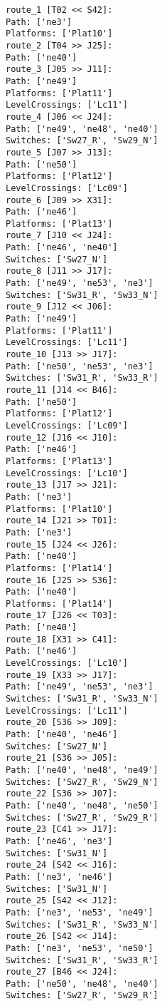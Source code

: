 	\begin{lstlisting}[language = {}, caption = Routes.RNA, label = {lst:EJ9_7}]
route_1 [T02 << S42]:
Path: ['ne3']
Platforms: ['Plat10']
route_2 [T04 >> J25]:
Path: ['ne40']
route_3 [J05 >> J11]:
Path: ['ne49']
Platforms: ['Plat11']
LevelCrossings: ['Lc11']
route_4 [J06 << J24]:
Path: ['ne49', 'ne48', 'ne40']
Switches: ['Sw27_R', 'Sw29_N']
route_5 [J07 >> J13]:
Path: ['ne50']
Platforms: ['Plat12']
LevelCrossings: ['Lc09']
route_6 [J09 >> X31]:
Path: ['ne46']
Platforms: ['Plat13']
route_7 [J10 << J24]:
Path: ['ne46', 'ne40']
Switches: ['Sw27_N']
route_8 [J11 >> J17]:
Path: ['ne49', 'ne53', 'ne3']
Switches: ['Sw31_R', 'Sw33_N']
route_9 [J12 << J06]:
Path: ['ne49']
Platforms: ['Plat11']
LevelCrossings: ['Lc11']
route_10 [J13 >> J17]:
Path: ['ne50', 'ne53', 'ne3']
Switches: ['Sw31_R', 'Sw33_R']
route_11 [J14 << B46]:
Path: ['ne50']
Platforms: ['Plat12']
LevelCrossings: ['Lc09']
route_12 [J16 << J10]:
Path: ['ne46']
Platforms: ['Plat13']
LevelCrossings: ['Lc10']
route_13 [J17 >> J21]:
Path: ['ne3']
Platforms: ['Plat10']
route_14 [J21 >> T01]:
Path: ['ne3']
route_15 [J24 << J26]:
Path: ['ne40']
Platforms: ['Plat14']
route_16 [J25 >> S36]:
Path: ['ne40']
Platforms: ['Plat14']
route_17 [J26 << T03]:
Path: ['ne40']
route_18 [X31 >> C41]:
Path: ['ne46']
LevelCrossings: ['Lc10']
route_19 [X33 >> J17]:
Path: ['ne49', 'ne53', 'ne3']
Switches: ['Sw31_R', 'Sw33_N']
LevelCrossings: ['Lc11']
route_20 [S36 >> J09]:
Path: ['ne40', 'ne46']
Switches: ['Sw27_N']
route_21 [S36 >> J05]:
Path: ['ne40', 'ne48', 'ne49']
Switches: ['Sw27_R', 'Sw29_N']
route_22 [S36 >> J07]:
Path: ['ne40', 'ne48', 'ne50']
Switches: ['Sw27_R', 'Sw29_R']
route_23 [C41 >> J17]:
Path: ['ne46', 'ne3']
Switches: ['Sw31_N']
route_24 [S42 << J16]:
Path: ['ne3', 'ne46']
Switches: ['Sw31_N']
route_25 [S42 << J12]:
Path: ['ne3', 'ne53', 'ne49']
Switches: ['Sw31_R', 'Sw33_N']
route_26 [S42 << J14]:
Path: ['ne3', 'ne53', 'ne50']
Switches: ['Sw31_R', 'Sw33_R']
route_27 [B46 << J24]:
Path: ['ne50', 'ne48', 'ne40']
Switches: ['Sw27_R', 'Sw29_R']
	\end{lstlisting}	
	